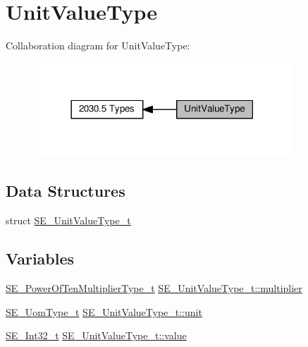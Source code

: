 \hypertarget{group__UnitValueType}{}\section{Unit\+Value\+Type}
\label{group__UnitValueType}
Collaboration diagram for Unit\+Value\+Type\+:\nopagebreak
\begin{figure}[H]
\begin{center}
\leavevmode
\includegraphics[width=273pt]{group__UnitValueType}
\end{center}
\end{figure}
\subsection*{Data Structures}
\begin{DoxyCompactItemize}
\item 
struct \hyperlink{structSE__UnitValueType__t}{S\+E\+\_\+\+Unit\+Value\+Type\+\_\+t}
\end{DoxyCompactItemize}
\subsection*{Variables}
\begin{DoxyCompactItemize}
\item 
\hyperlink{group__PowerOfTenMultiplierType_gaf0317b781dc8dbb9cb6ac4e44a14fdef}{S\+E\+\_\+\+Power\+Of\+Ten\+Multiplier\+Type\+\_\+t} \hyperlink{group__UnitValueType_gad8cc28fe5b8c89ba39ea5a7f440dc024}{S\+E\+\_\+\+Unit\+Value\+Type\+\_\+t\+::multiplier}
\item 
\hyperlink{group__UomType_ga35de8fcdea40d7edbdd341581cf651f1}{S\+E\+\_\+\+Uom\+Type\+\_\+t} \hyperlink{group__UnitValueType_ga1f1f3ce4391af53b2ef4dd5a3597efc4}{S\+E\+\_\+\+Unit\+Value\+Type\+\_\+t\+::unit}
\item 
\hyperlink{group__Int32_gaa7afc819cfc8033c5fa408e34da8b71a}{S\+E\+\_\+\+Int32\+\_\+t} \hyperlink{group__UnitValueType_gaf0db03a368be714590179d34320e67b6}{S\+E\+\_\+\+Unit\+Value\+Type\+\_\+t\+::value}
\end{DoxyCompactItemize}


